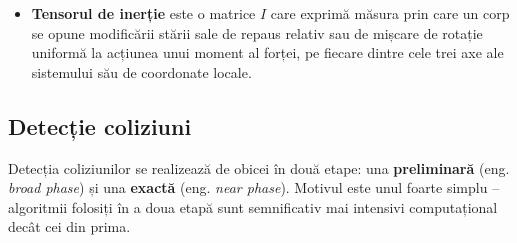 \documentclass[12pt,a4paper]{report}
\begin{document}
\begin{itemize}
	\label{barycentric_coordinates}
	\item \textbf{Tensorul de inerție} este o matrice $I$ care exprimă măsura prin care un corp se opune modificării stării sale de repaus relativ sau de mișcare de rotație uniformă la acțiunea unui moment al forței, pe fiecare dintre cele trei axe ale sistemului său de coordonate locale.
	\label{inertia_tensor}
	
\end{itemize}

\subsection{Detecție coliziuni}
Detecția coliziunilor se realizează de obicei în două etape: una \textbf{preliminară} (eng. \textit{broad phase}) și una \textbf{exactă} (eng. \textit{near phase}). Motivul este unul foarte simplu -- algoritmii folosiți în a doua etapă sunt semnificativ mai intensivi computațional decât cei din prima.
\end{document}

